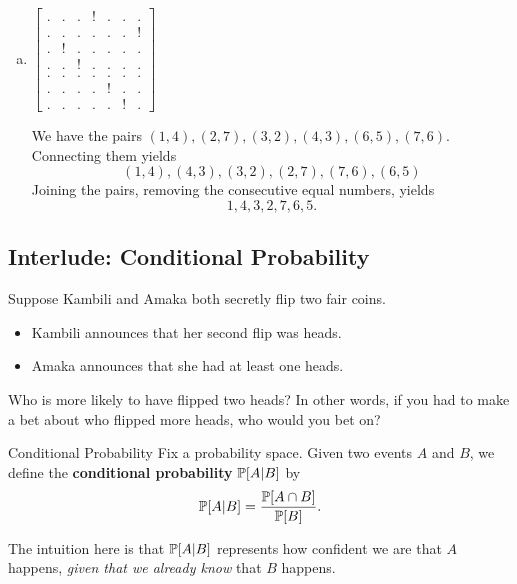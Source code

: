 \documentclass[letterpaper]{article}
\begin{document}
\begin{mdframed}
\begin{enumerate}[(a)]
        \item $\begin{bmatrix}
            . & . & . & ! & . & . & . \\ 
            . & . & . & . & . & . & ! \\ 
            . & ! & . & . & . & . & . \\ 
            . & . & ! & . & . & . & . \\ 
            . & . & . & . & . & . & . \\ 
            . & . & . & . & ! & . & . \\ 
            . & . & . & . & . & ! & .
        \end{bmatrix}$
        \begin{mdframed}
            We have the pairs $(1, 4), (2, 7), (3, 2), (4, 3), (6, 5), (7, 6)$. Connecting them yields 
            \[(1, 4), (4, 3), (3, 2), (2, 7), (7, 6), (6, 5)\]
            Joining the pairs, removing the consecutive equal numbers, yields 
            \[1, 4, 3, 2, 7, 6, 5.\]
        \end{mdframed}
    \end{enumerate}
\end{mdframed}

\subsection{Interlude: Conditional Probability}
Suppose Kambili and Amaka both secretly flip two fair coins. 
\begin{itemize}
    \item Kambili announces that her second flip was heads. 
    \item Amaka announces that she had at least one heads.
\end{itemize}
Who is more likely to have flipped two heads? In other words, if you had to make a bet about who flipped more heads, who would you bet on? 

\begin{definition}{Conditional Probability}{}
    Fix a probability space. Given two events $A$ and $B$, we define the \textbf{conditional probability} $\mathbb{P}[A | B]$ by 
    \[\mathbb{P}[A | B] = \frac{\mathbb{P}[A \cap B]}{\mathbb{P}[B]}.\]
\end{definition}
The intuition here is that $\mathbb{P}[A | B]$ represents how confident we are that $A$ happens, \emph{given that we already know} that $B$ happens.
\end{document}
